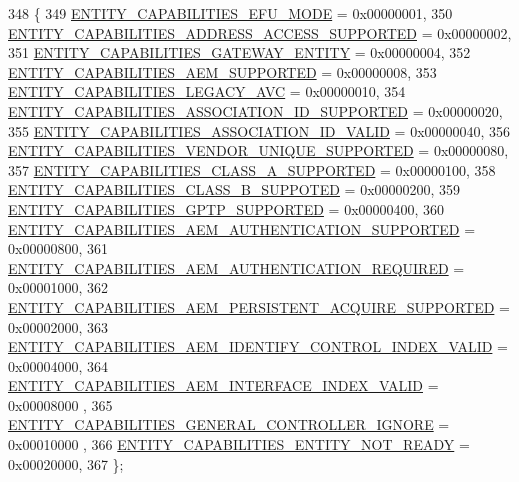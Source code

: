 \begin{DoxyCode}
348 \{
349     \hyperlink{namespaceavdecc__lib_a7904f1f7ce9b1358c7158a9dffc7319da46364e5a701fc34a2af9dfd561ed3aec}{ENTITY\_CAPABILITIES\_EFU\_MODE} = 0x00000001,
350     \hyperlink{namespaceavdecc__lib_a7904f1f7ce9b1358c7158a9dffc7319dab5acf61358793027960465285c31dc82}{ENTITY\_CAPABILITIES\_ADDRESS\_ACCESS\_SUPPORTED} = 0x00000002,
351     \hyperlink{namespaceavdecc__lib_a7904f1f7ce9b1358c7158a9dffc7319daf02446d7857131e494d0acbf346abaec}{ENTITY\_CAPABILITIES\_GATEWAY\_ENTITY} = 0x00000004,
352     \hyperlink{namespaceavdecc__lib_a7904f1f7ce9b1358c7158a9dffc7319daa18e66b7496ce73e2596d8f30bb18f40}{ENTITY\_CAPABILITIES\_AEM\_SUPPORTED} = 0x00000008,
353     \hyperlink{namespaceavdecc__lib_a7904f1f7ce9b1358c7158a9dffc7319da9e2a4da4fdfc17e2be0dd7a47ee6eb32}{ENTITY\_CAPABILITIES\_LEGACY\_AVC} = 0x00000010,
354     \hyperlink{namespaceavdecc__lib_a7904f1f7ce9b1358c7158a9dffc7319daa1ed17e931a0b1bbd2b58ed8a952bb73}{ENTITY\_CAPABILITIES\_ASSOCIATION\_ID\_SUPPORTED} = 0x00000020,
355     \hyperlink{namespaceavdecc__lib_a7904f1f7ce9b1358c7158a9dffc7319daec978ed46b2558f86a7f6e0d454f73c0}{ENTITY\_CAPABILITIES\_ASSOCIATION\_ID\_VALID} = 0x00000040,
356     \hyperlink{namespaceavdecc__lib_a7904f1f7ce9b1358c7158a9dffc7319da0390d60ea314baff9475942ba1c800e7}{ENTITY\_CAPABILITIES\_VENDOR\_UNIQUE\_SUPPORTED} = 0x00000080,
357     \hyperlink{namespaceavdecc__lib_a7904f1f7ce9b1358c7158a9dffc7319da9ce10f1cf342140a0bf78429a943abf9}{ENTITY\_CAPABILITIES\_CLASS\_A\_SUPPORTED} = 0x00000100,
358     \hyperlink{namespaceavdecc__lib_a7904f1f7ce9b1358c7158a9dffc7319dade0febcf21837d36c15978870251ab8f}{ENTITY\_CAPABILITIES\_CLASS\_B\_SUPPOTED} = 0x00000200,
359     \hyperlink{namespaceavdecc__lib_a7904f1f7ce9b1358c7158a9dffc7319da8d1d2cc7b15422d1d05335b60e5bd88b}{ENTITY\_CAPABILITIES\_GPTP\_SUPPORTED} = 0x00000400,
360     \hyperlink{namespaceavdecc__lib_a7904f1f7ce9b1358c7158a9dffc7319da940c7f5ab8c14b91e9af3e62f749029d}{ENTITY\_CAPABILITIES\_AEM\_AUTHENTICATION\_SUPPORTED} = 
      0x00000800,
361     \hyperlink{namespaceavdecc__lib_a7904f1f7ce9b1358c7158a9dffc7319da5da99877f8bb8157ac0734acb3e80da3}{ENTITY\_CAPABILITIES\_AEM\_AUTHENTICATION\_REQUIRED} = 
      0x00001000,
362     \hyperlink{namespaceavdecc__lib_a7904f1f7ce9b1358c7158a9dffc7319da708f8d86407621915384b32c820fd228}{ENTITY\_CAPABILITIES\_AEM\_PERSISTENT\_ACQUIRE\_SUPPORTED}
       = 0x00002000,
363     \hyperlink{namespaceavdecc__lib_a7904f1f7ce9b1358c7158a9dffc7319da71a7b0ff99e3202fb031582289852b02}{ENTITY\_CAPABILITIES\_AEM\_IDENTIFY\_CONTROL\_INDEX\_VALID}
       = 0x00004000,
364     \hyperlink{namespaceavdecc__lib_a7904f1f7ce9b1358c7158a9dffc7319da9f7f72e16d61d08c4b044c0ddf417f77}{ENTITY\_CAPABILITIES\_AEM\_INTERFACE\_INDEX\_VALID} = 0x00008000
      ,
365     \hyperlink{namespaceavdecc__lib_a7904f1f7ce9b1358c7158a9dffc7319da913cd2c42673f0f5147c585764823b28}{ENTITY\_CAPABILITIES\_GENERAL\_CONTROLLER\_IGNORE} = 0x00010000
      ,
366     \hyperlink{namespaceavdecc__lib_a7904f1f7ce9b1358c7158a9dffc7319daa95b8e9f579e9cc624e814858927d54a}{ENTITY\_CAPABILITIES\_ENTITY\_NOT\_READY} = 0x00020000,
367 \};
\end{DoxyCode}
